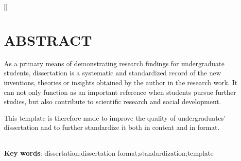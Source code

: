 \cleardoublepage




{}
[]

\section*{ABSTRACT}

As a primary means of demonstrating research findings for undergraduate students, dissertation is a systematic and standardized record of the new inventions, theories or insights obtained by the author in the research work. It can not only function as an important reference when students pursue further studies, but also contribute to scientific research and social development.\par 
This template is therefore made to improve the quality of undergraduates’ dissertation and to further standardize it both in content and in format.

~\\ 
\hspace*{2em}\textbf{Key words}: dissertation;dissertation format;standardization;template\\
